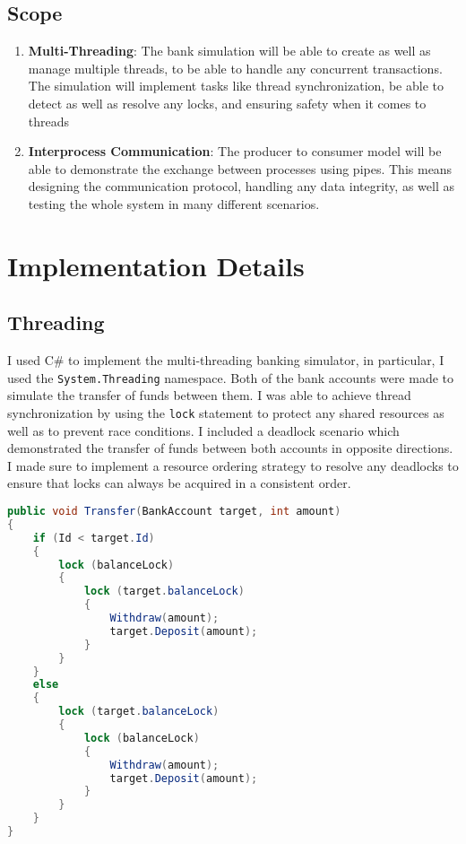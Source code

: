 \documentclass{article}
\begin{document}
\subsection*{Scope}
\begin{enumerate}
    \item \textbf{Multi-Threading}: The bank simulation will be able to create as well as manage multiple threads, to be able to handle any concurrent transactions. The simulation will implement tasks like thread synchronization, be able to detect as well as resolve any locks, and ensuring safety when it comes to threads

    \item \textbf{Interprocess Communication}: The producer to consumer model will be able to demonstrate the exchange between processes using pipes. This means designing the communication protocol, handling any data integrity, as well as testing the whole system in many different scenarios. 
\end{enumerate}

\section*{Implementation Details}

\subsection*{Threading}

I used C\# to implement the multi-threading banking simulator, in particular, I used the \texttt{System.Threading} namespace. Both of the bank accounts were made to simulate the transfer of funds between them. I was able to achieve thread synchronization by using the \texttt{lock} statement to protect any shared resources as well as to prevent race conditions. I included a deadlock scenario which demonstrated the transfer of funds between both accounts in opposite directions. I made sure to implement a resource ordering strategy to resolve any deadlocks to ensure that locks can always be acquired in a consistent order.

\begin{lstlisting}[language=C#]
public void Transfer(BankAccount target, int amount)
{
    if (Id < target.Id)
    {
        lock (balanceLock)
        {
            lock (target.balanceLock)
            {
                Withdraw(amount);
                target.Deposit(amount);
            }
        }
    }
    else
    {
        lock (target.balanceLock)
        {
            lock (balanceLock)
            {
                Withdraw(amount);
                target.Deposit(amount);
            }
        }
    }
}
\end{lstlisting}
\end{document}
